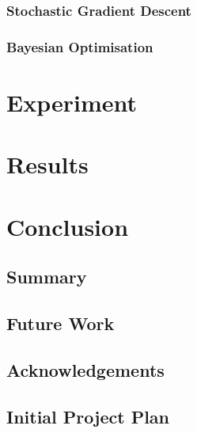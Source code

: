 \documentclass[a4paper]{report}
\begin{document}
\subsection{Stochastic Gradient Descent}

\subsection{Bayesian Optimisation}

\chapter{Experiment}


\chapter{Results}

\chapter{Conclusion}
\section{Summary}

\section{Future Work}

\section{Acknowledgements}





\begin{appendices}

\chapter{Initial Project Plan}


    
\end{appendices}
\end{document}
